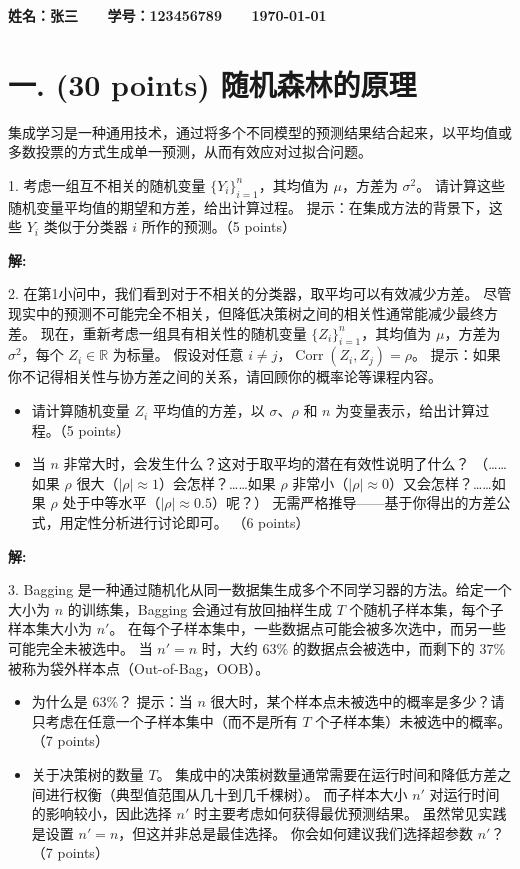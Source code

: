 \documentclass[8pt]{article}
\begin{document}
\textbf{\color{blue} \Large 姓名：张三 \ \ \ 学号：123456789 \ \ \ \today}


\section*{一. (30 points) 随机森林的原理}

集成学习是一种通用技术，通过将多个不同模型的预测结果结合起来，以平均值或多数投票的方式生成单一预测，从而有效应对过拟合问题。


1. 考虑一组互不相关的随机变量 $\{Y_i\}_{i=1}^n$，其均值为 $\mu$，方差为 $\sigma^2$。  
请计算这些随机变量平均值的期望和方差，给出计算过程。  
提示：在集成方法的背景下，这些 $Y_i$ 类似于分类器 $i$ 所作的预测。（5 points）

\textbf{\large 解:}
\vspace{3em}

2. 在第1小问中，我们看到对于不相关的分类器，取平均可以有效减少方差。  
尽管现实中的预测不可能完全不相关，但降低决策树之间的相关性通常能减少最终方差。  
现在，重新考虑一组具有相关性的随机变量 $\{Z_i\}_{i=1}^n$，其均值为 $\mu$，方差为 $\sigma^2$，每个 $Z_i \in \mathbb{R}$ 为标量。  
假设对任意 $i \neq j$，$\operatorname{Corr}(Z_i, Z_j) = \rho$。  
提示：如果你不记得相关性与协方差之间的关系，请回顾你的概率论等课程内容。 
\begin{itemize}
\item
请计算随机变量 $Z_i$ 平均值的方差，以 $\sigma$、$\rho$ 和 $n$ 为变量表示，给出计算过程。（5 points）  
\item
当 $n$ 非常大时，会发生什么？这对于取平均的潜在有效性说明了什么？  
（……如果 $\rho$ 很大（$| \rho | \approx 1$）会怎样？……如果 $\rho$ 非常小（$|\rho| \approx 0$）又会怎样？……如果 $\rho$ 处于中等水平（$|\rho| \approx 0.5$）呢？）  
无需严格推导——基于你得出的方差公式，用定性分析进行讨论即可。 （6 points）
\end{itemize}

\textbf{\large 解:}

\vspace{3em}

3. Bagging 是一种通过随机化从同一数据集生成多个不同学习器的方法。给定一个大小为 $n$ 的训练集，Bagging 会通过有放回抽样生成 $T$ 个随机子样本集，每个子样本集大小为 $n'$。
在每个子样本集中，一些数据点可能会被多次选中，而另一些可能完全未被选中。
当 $n' = n$ 时，大约 $63\%$ 的数据点会被选中，而剩下的 $37\%$ 被称为袋外样本点（Out-of-Bag，OOB）。
\begin{itemize}
\item
为什么是 $63\%$？
提示：当 $n$ 很大时，某个样本点未被选中的概率是多少？请只考虑在任意一个子样本集中（而不是所有 $T$ 个子样本集）未被选中的概率。（7 points）
\item
关于决策树的数量 $T$。
集成中的决策树数量通常需要在运行时间和降低方差之间进行权衡（典型值范围从几十到几千棵树）。
而子样本大小 $n'$ 对运行时间的影响较小，因此选择 $n'$ 时主要考虑如何获得最优预测结果。
虽然常见实践是设置 $n' = n$，但这并非总是最佳选择。
你会如何建议我们选择超参数 $n'$？ （7 points）
\end{itemize}
\end{document}
